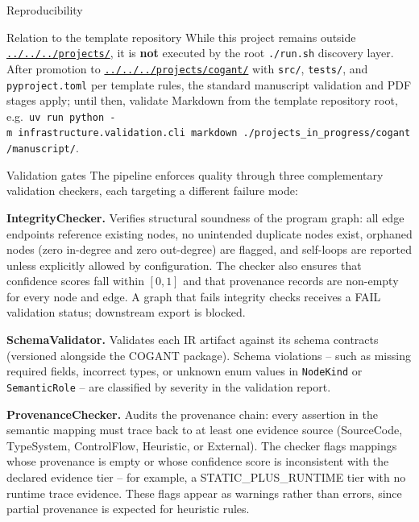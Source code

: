 \documentclass[
  ignorenonframetext,
]{beamer}
\begin{document}
\begin{frame}[fragile]{Reproducibility}
\begin{block}{Relation to the template repository}
\protect{}\label{relation-to-the-template-repository}
While this project remains outside
\href{../../../projects/}{\texttt{../../../projects/}}, it is
\textbf{not} executed by the root \texttt{./run.sh} discovery layer.
After promotion to
\href{../../../projects/cogant/}{\texttt{../../../projects/cogant/}}
with \texttt{src/}, \texttt{tests/}, and \texttt{pyproject.toml} per
template rules, the standard manuscript validation and PDF stages apply;
until then, validate Markdown from the template repository root,
e.g.~\texttt{uv\ run\ python\ -m\ infrastructure.validation.cli\ markdown\ ./projects\_in\_progress/cogant/manuscript/}.
\end{block}

\begin{block}{Validation gates}
\protect{}\label{validation-gates}
The pipeline enforces quality through three complementary validation
checkers, each targeting a different failure mode:

\textbf{IntegrityChecker.} Verifies structural soundness of the program
graph: all edge endpoints reference existing nodes, no unintended
duplicate nodes exist, orphaned nodes (zero in-degree and zero
out-degree) are flagged, and self-loops are reported unless explicitly
allowed by configuration. The checker also ensures that confidence
scores fall within \([0, 1]\) and that provenance records are non-empty
for every node and edge. A graph that fails integrity checks receives a
FAIL validation status; downstream export is blocked.

\textbf{SchemaValidator.} Validates each IR artifact against its schema
contracts (versioned alongside the COGANT package). Schema violations --
such as missing required fields, incorrect types, or unknown enum values
in \texttt{NodeKind} or \texttt{SemanticRole} -- are classified by
severity in the validation report.

\textbf{ProvenanceChecker.} Audits the provenance chain: every assertion
in the semantic mapping must trace back to at least one evidence source
(SourceCode, TypeSystem, ControlFlow, Heuristic, or External). The
checker flags mappings whose provenance is empty or whose confidence
score is inconsistent with the declared evidence tier -- for example, a
STATIC\_PLUS\_RUNTIME tier with no runtime trace evidence. These flags
appear as warnings rather than errors, since partial provenance is
expected for heuristic rules.


\end{block}
\end{frame}
\end{document}

